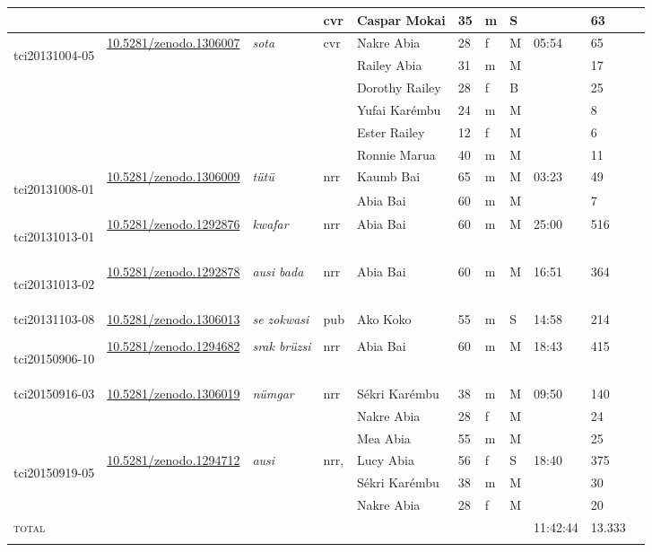 \begin{landscape}
{\begin{longtable}{p{}llllllllll}
	&&&cvr& Caspar Mokai & 35 & m & S & & 63\\\hline
	\multirow{6}{*}{\hypertarget{tci20131004-05}{tci20131004-05}}&\multirow{6}{*}{\href{https://zenodo.org/record/1306007}{10.5281/zenodo.1306007}}&\multirow{6}{*}{\emph{sota}}&\multirow{6}{*}{cvr}&Nakre Abia & 28 & f & M & \multirow{6}{*}{05:54} & 65\\
	&&&&Railey Abia & 31 & m & M && 17\\
	&&&&Dorothy Railey & 28 & f & B && 25\\
	&&&&Yufai Karémbu & 24 & m & M &&8\\ 
	&&&&Ester Railey & 12 & f & M && 6\\
	&&&& Ronnie Marua & 40 & m & M &&11\\\hline
	\multirow{2}{*}{\hypertarget{tci20131008-01}{tci20131008-01}} &\multirow{2}{*}{\href{https://zenodo.org/record/1306009}{10.5281/zenodo.1306009}}& \multirow{2}{*}{\emph{tütü}} & \multirow{2}{*}{nrr} & Kaumb Bai & 65 & m & M & \multirow{2}{*}{03:23} & 49\\
	&&&& Abia Bai & 60 & m & M && 7 \\\hline
	\hypertarget{tci20131013-01}{tci20131013-01} &\href{https://zenodo.org/record/1292876}{10.5281/zenodo.1292876}& \emph{kwafar} & nrr & Abia Bai & 60 & m & M & 25:00 & 516 \\\hline
	\hypertarget{tci20131013-02}{tci20131013-02} &\href{https://zenodo.org/record/1292878}{10.5281/zenodo.1292878}& \emph{ausi bada} & nrr & Abia Bai & 60 & m & M & 16:51 & 364 \\\hline
	tci20131103-08 	&\href{https://zenodo.org/record/1306013}{10.5281/zenodo.1306013}& \emph{se zokwasi} & pub & Ako Koko & 55 & m & S & 14:58 & 214\\\hline
	& & & & & & & & & \\
	\hypertarget{tci20150906-10}{tci20150906-10} &\href{https://zenodo.org/record/1294682}{10.5281/zenodo.1294682}& \emph{srak brüzsi} & nrr & Abia Bai & 60 & m & M & 18:43 & 415 \\\hline
	\multirow{3}{*}{tci20150916-03} &\multirow{3}{*}{\href{https://zenodo.org/record/1306019}{10.5281/zenodo.1306019}}& \multirow{3}{*}{\emph{nümgar}} & \multirow{3}{*}{nrr} & Sékri Karémbu & 38 & m & M &\multirow{3}{*}{09:50}& 140\\
	&&&& Nakre Abia & 28 & f & M & & 24\\
	&&&& Mea Abia & 55 & m & M && 25\\\hline
	\multirow{3}{*}{\hypertarget{tci20150919-05}{tci20150919-05}} &\multirow{3}{*}{\href{https://zenodo.org/record/1294712}{10.5281/zenodo.1294712}}& \multirow{3}{*}{\emph{ausi}} & \multirow{2}{*}{nrr,} & Lucy Abia & 56 & f & S &\multirow{3}{*}{18:40}& 375\\
	&&&\multirow{2}{*}{cvr}& Sékri Karémbu & 38 & m & M && 30\\
	&&&& Nakre Abia & 28 & f & M & & 20\\\hline
	\textsc{total}&&&&&&&&11:42:44&13.333\\
	\lspbottomrule
\end{longtable}}%
\end{landscape}